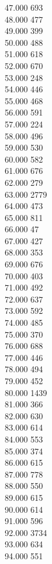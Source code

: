 { 47.000	693 \\
 48.000	477 \\
 49.000	399 \\
 50.000	488 \\
 51.000	618 \\
 52.000	670 \\
 53.000	248 \\
 54.000	446 \\
 55.000	468 \\
 56.000	591 \\
 57.000	224 \\
 58.000	496 \\
 59.000	530 \\
 60.000	582 \\
 61.000	676 \\
 62.000	279 \\
 63.000	2779 \\
 64.000	473 \\
 65.000	811 \\
 66.000	47 \\
 67.000	427 \\
 68.000	353 \\
 69.000	676 \\
 70.000	403 \\
 71.000	492 \\
 72.000	637 \\
 73.000	592 \\
 74.000	485 \\
 75.000	370 \\
 76.000	688 \\
 77.000	446 \\
 78.000	494 \\
 79.000	452 \\
 80.000	1439 \\
 81.000	366 \\
 82.000	630 \\
 83.000	614 \\
 84.000	553 \\
 85.000	374 \\
 86.000	615 \\
 87.000	778 \\
 88.000	550 \\
 89.000	615 \\
 90.000	614 \\
 91.000	596 \\
 92.000	3734 \\
 93.000	634 \\
 94.000	551 \\
}
